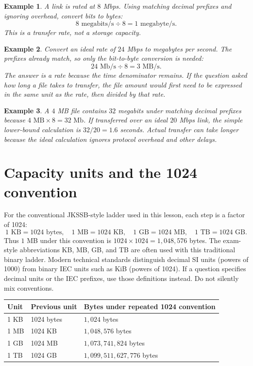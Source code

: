 \documentclass[11pt]{article}
\newtheorem{example}{Example}[section]
\begin{document}
\begin{example}
A link is rated at $8$ Mbps. Using matching decimal prefixes and ignoring
overhead, convert bits to bytes:
\[
8\text{ megabits/s}\div 8=1\text{ megabyte/s}.
\]
This is a transfer rate, not a storage capacity.
\end{example}

\begin{example}
Convert an ideal rate of $24$ Mbps to megabytes per second. The prefixes
already match, so only the bit-to-byte conversion is needed:
\[
  24\text{ Mb/s}\div 8=3\text{ MB/s}.
\]
The answer is a rate because the time denominator remains. If the question
asked how long a file takes to transfer, the file amount would first need to
be expressed in the same unit as the rate, then divided by that rate.
\end{example}

\begin{example}
A $4$ MB file contains $32$ megabits under matching decimal prefixes because
$4\text{ MB}\times 8=32\text{ Mb}$. If transferred over an ideal $20$ Mbps
link, the simple lower-bound calculation is $32/20=1.6$ seconds. Actual
transfer can take longer because the ideal calculation ignores protocol
overhead and other delays.
\end{example}

\section{Capacity units and the 1024 convention}
For the conventional JKSSB-style ladder used in this lesson, each step is a
factor of 1024:
\[
1\text{ KB}=1024\text{ bytes},\quad
1\text{ MB}=1024\text{ KB},\quad
1\text{ GB}=1024\text{ MB},\quad
1\text{ TB}=1024\text{ GB}.
\]
Thus $1$ MB under this convention is $1024\times1024=1{,}048{,}576$ bytes.
The exam-style abbreviations KB, MB, GB, and TB are often used with this
traditional binary ladder. Modern technical standards distinguish decimal
SI units (powers of 1000) from binary IEC units such as KiB (powers of 1024).
If a question specifies decimal units or the IEC prefixes, use those
definitions instead. Do not silently mix conventions.

\begin{center}
\begin{tabular}{p{}p{}p{}}
\toprule
\textbf{Unit} & \textbf{Previous unit} & \textbf{Bytes under repeated 1024 convention}\\
\midrule
1 KB & 1024 bytes & $1{,}024$ bytes\\
1 MB & 1024 KB & $1{,}048{,}576$ bytes\\
1 GB & 1024 MB & $1{,}073{,}741{,}824$ bytes\\
1 TB & 1024 GB & $1{,}099{,}511{,}627{,}776$ bytes\\
\bottomrule
\end{tabular}
\end{center}
\end{document}

